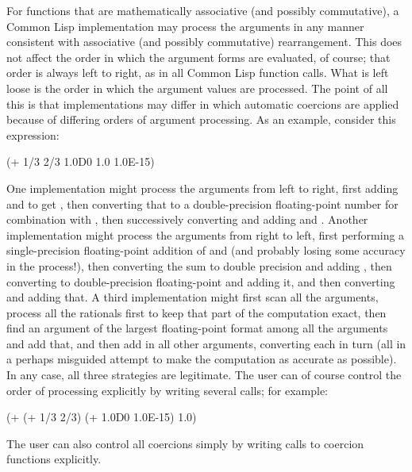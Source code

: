 For functions that are mathematically associative (and possibly commutative),
a Common Lisp implementation may process the arguments in any manner consistent
with associative (and possibly commutative) rearrangement.
This does not affect the order in which the argument forms
are evaluated, of course; that order is always left to right,
as in all Common Lisp function calls.  What is left loose is the
order in which the argument values are processed.
The point of all this is that implementations may differ in 
which automatic coercions are applied because of differing
orders of argument processing.  As an example, consider this
expression:
\begin{lisp}
(+ 1/3 2/3 1.0D0 1.0 1.0E-15)
\end{lisp}
One implementation might process the arguments from left to right,
first adding  and  to get , then converting that
to a double-precision floating-point number for combination
with , then successively converting and adding  and
.  Another implementation might process the arguments
from right to left, first performing a single-precision floating-point addition
of  and  (and probably losing some accuracy
in the process!), then converting the sum to double precision
and adding , then converting  to double-precision
floating-point and adding it, and then converting  and adding that.
A third implementation might first scan all the arguments, process
all the rationals first to keep that part of the computation exact,
then find an argument of the largest floating-point format among all
the arguments and add that, and then add in all other arguments,
converting each in turn (all in a perhaps misguided attempt to make
the computation as accurate as possible).  In any case, all three
strategies are legitimate.  The user can of course control the order of
processing explicitly by writing several calls; for example:
\begin{lisp}
(+ (+ 1/3 2/3) (+ 1.0D0 1.0E-15) 1.0)
\end{lisp}
The user can also control all coercions simply by writing calls
to coercion functions explicitly.

